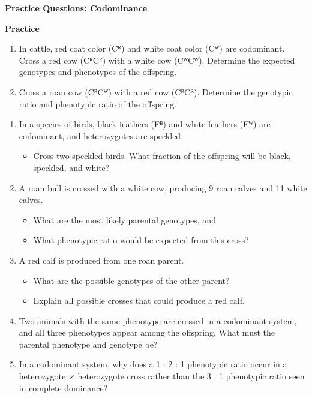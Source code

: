 \documentclass[
  letterpaper,
  DIV=11,
  numbers=noendperiod]{scrreprt}
\providecommand{\tightlist}{%
  \setlength{\itemsep}{0pt}\setlength{\parskip}{0pt}}
\begin{document}
\textbf{Practice Questions: Codominance}

\textbf{Practice}

\begin{enumerate}
\def\labelenumi{\arabic{enumi}.}
\item
  In cattle, red coat color (Cᴿ) and white coat color (Cᵂ) are
  codominant. Cross a red cow (CᴿCᴿ) with a white cow (CᵂCᵂ). Determine
  the expected genotypes and phenotypes of the offspring.
\item
  Cross a roan cow (CᴿCᵂ) with a red cow (CᴿCᴿ). Determine the genotypic
  ratio and phenotypic ratio of the offspring.
\end{enumerate}

\begin{enumerate}
\def\labelenumi{\arabic{enumi}.}
\setcounter{enumi}{2}
\item
  In a species of birds, black feathers (Fᴮ) and white feathers (Fᵂ) are
  codominant, and heterozygotes are speckled.

  \begin{itemize}
  \tightlist
  \item
    Cross two speckled birds. What fraction of the offspring will be
    black, speckled, and white?
  \end{itemize}
\item
  A roan bull is crossed with a white cow, producing 9 roan calves and
  11 white calves.

  \begin{itemize}
  \item
    What are the most likely parental genotypes, and
  \item
    What phenotypic ratio would be expected from this cross?
  \end{itemize}
\item
  A red calf is produced from one roan parent.

  \begin{itemize}
  \item
    What are the possible genotypes of the other parent?
  \item
    Explain all possible crosses that could produce a red calf.
  \end{itemize}
\item
  Two animals with the same phenotype are crossed in a codominant
  system, and all three phenotypes appear among the offspring. What must
  the parental phenotype and genotype be?
\item
  In a codominant system, why does a 1 : 2 : 1 phenotypic ratio occur in
  a heterozygote × heterozygote cross rather than the 3 : 1 phenotypic
  ratio seen in complete dominance?
\end{enumerate}
\end{document}
